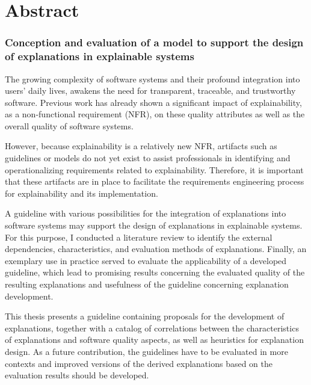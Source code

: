 \clearpage

\chapter*{Abstract}

\subsection*{Conception and evaluation of a model to support the design of explanations in explainable systems}

The growing complexity of software systems and their profound integration into users’ daily lives, awakens the need for transparent, traceable, and trustworthy software. Previous work  has already shown a significant impact of explainability, as a non-functional requirement (NFR), on these quality attributes as well as the overall quality of software systems.

However, because explainability is a relatively new NFR, artifacts such as guidelines or models do not yet exist to assist professionals in identifying and operationalizing requirements related to explainability. Therefore, it is important that these artifacts are in place to facilitate the requirements engineering process for explainability and its implementation.

A guideline with various possibilities for the integration of explanations into software systems may support the design of explanations in explainable systems. For this purpose, I conducted a literature review to identify the external dependencies, characteristics, and evaluation methods of explanations. Finally, an exemplary use in practice served to evaluate the applicability of a developed guideline, which lead to promising results concerning the evaluated quality of the resulting explanations and usefulness of the guideline concerning explanation development.

This thesis presents a guideline containing proposals for the development of explanations, together with a catalog of correlations between the characteristics of explanations and software quality aspects, as well as heuristics for explanation design. As a future contribution, the guidelines have to be evaluated in more contexts and improved versions of the derived explanations based on the evaluation results should be developed.

\clearpage